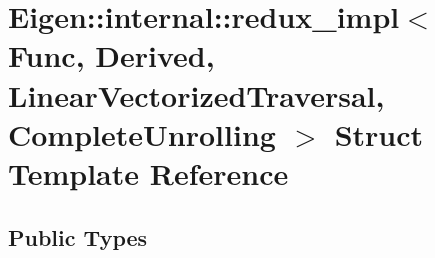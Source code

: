 \hypertarget{struct_eigen_1_1internal_1_1redux__impl_3_01_func_00_01_derived_00_01_linear_vectorized_traversal_00_01_complete_unrolling_01_4}{}\section{Eigen\+:\+:internal\+:\+:redux\+\_\+impl$<$ Func, Derived, Linear\+Vectorized\+Traversal, Complete\+Unrolling $>$ Struct Template Reference}
\label{struct_eigen_1_1internal_1_1redux__impl_3_01_func_00_01_derived_00_01_linear_vectorized_traversal_00_01_complete_unrolling_01_4}
\subsection*{Public Types}
